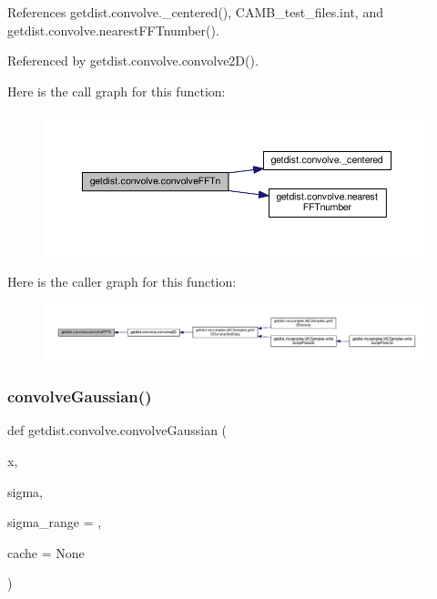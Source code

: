 References getdist.\+convolve.\+\_\+centered(), C\+A\+M\+B\+\_\+test\+\_\+files.\+int, and getdist.\+convolve.\+nearest\+F\+F\+Tnumber().



Referenced by getdist.\+convolve.\+convolve2\+D().

Here is the call graph for this function\+:
\nopagebreak
\begin{figure}[H]
\begin{center}
\leavevmode
\includegraphics[width=350pt]{namespacegetdist_1_1convolve_a72fc3a89b0f824b66fc4e547a0783bdc_cgraph}
\end{center}
\end{figure}
Here is the caller graph for this function\+:
\nopagebreak
\begin{figure}[H]
\begin{center}
\leavevmode
\includegraphics[width=350pt]{namespacegetdist_1_1convolve_a72fc3a89b0f824b66fc4e547a0783bdc_icgraph}
\end{center}
\end{figure}
\mbox{\label{namespacegetdist_1_1convolve_ab80d0e9a346922b403393e83be18b56e}} 
\subsubsection{\texorpdfstring{convolve\+Gaussian()}{convolveGaussian()}}
{\footnotesize\ttfamily def getdist.\+convolve.\+convolve\+Gaussian (\begin{DoxyParamCaption}\item[{}]{x,  }\item[{}]{sigma,  }\item[{}]{sigma\+\_\+range = {},  }\item[{}]{cache = {\ttfamily None} }\end{DoxyParamCaption})}


